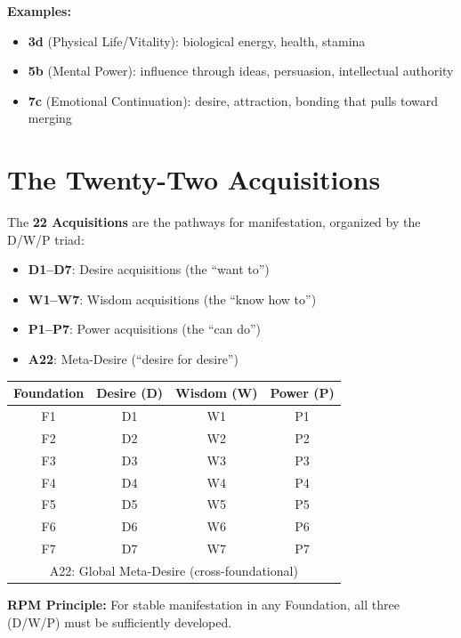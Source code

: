 \documentclass[11pt,twoside,openright]{book}
\theoremstyle{definition}
\theoremstyle{plain}
\theoremstyle{remark}
\begin{document}
\textbf{Examples:}
\begin{itemize}
  \item \textbf{3d} (Physical Life/Vitality): biological energy, health, stamina
  \item \textbf{5b} (Mental Power): influence through ideas, persuasion, intellectual authority
  \item \textbf{7c} (Emotional Continuation): desire, attraction, bonding that pulls toward merging
\end{itemize}

\section{The Twenty-Two Acquisitions}
\label{sec:acquisitions}

The \textbf{22 Acquisitions} are the pathways for manifestation, organized by the D/W/P triad:

\begin{itemize}
  \item \textbf{D1--D7}: Desire acquisitions (the ``want to'')
  \item \textbf{W1--W7}: Wisdom acquisitions (the ``know how to'')
  \item \textbf{P1--P7}: Power acquisitions (the ``can do'')
  \item \textbf{A22}: Meta-Desire (``desire for desire'')
\end{itemize}

\begin{center}
\begin{tabular}{c|ccc}
\toprule
\textbf{Foundation} & \textbf{Desire (D)} & \textbf{Wisdom (W)} & \textbf{Power (P)} \\
\midrule
F1 & D1 & W1 & P1 \\
F2 & D2 & W2 & P2 \\
F3 & D3 & W3 & P3 \\
F4 & D4 & W4 & P4 \\
F5 & D5 & W5 & P5 \\
F6 & D6 & W6 & P6 \\
F7 & D7 & W7 & P7 \\
\midrule
\multicolumn{4}{c}{A22: Global Meta-Desire (cross-foundational)} \\
\bottomrule
\end{tabular}
\end{center}

\textbf{RPM Principle:} For stable manifestation in any Foundation, all three (D/W/P) must be sufficiently developed.
\end{document}
